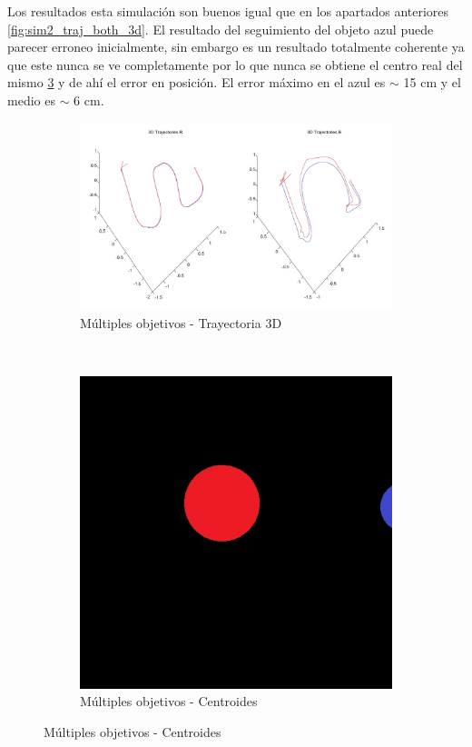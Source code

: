 	Los resultados esta simulaci\'on son buenos igual que en los apartados anteriores \ref{fig:sim2_traj_both_3d}. El resultado del seguimiento del objeto azul puede parecer erroneo inicialmente, sin embargo es un resultado totalmente coherente ya que este nunca se ve completamente por lo que nunca se obtiene el centro real del mismo \ref{fig:sim4_centroid_objs} y de ah\'i el error en posici\'on. El error m\'aximo en el azul es $\sim$ 15 cm y el medio es $\sim$ 6 cm.



\begin{figure}[hp]
	\centering
	\begin{subfigure}{0.45\linewidth}
		\centering
		\includegraphics[width=\linewidth]{../Images/c3/sim4_3dtraj}
		\caption{M\'ultiples objetivos - Trayectoria 3D}
		\label{fig:sim4_3dtraj}
	\end{subfigure}
	~
	\begin{subfigure}{0.2\linewidth}
		\centering
		\includegraphics[width=\linewidth]{../Images/c3/sims_two_object_centroid_out}
		\caption{M\'ultiples objetivos - Centroides}
		\label{fig:sim4_centroid_objs}
	\end{subfigure}
\end{figure}
